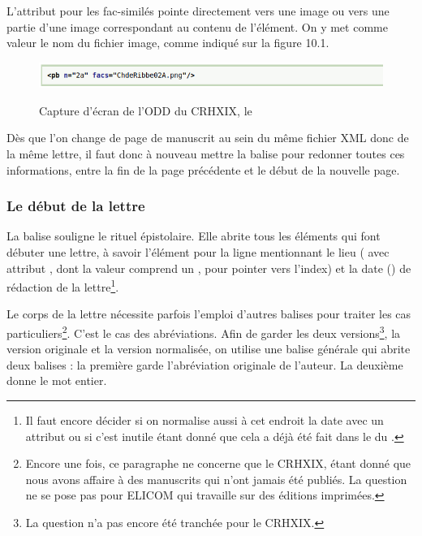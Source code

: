 L'attribut  pour les fac-similés pointe directement vers une image ou vers une partie d'une image correspondant au contenu de l'élément. On y met comme valeur le nom du fichier image, comme indiqué sur la figure 10.1.

\begin{figure}[ht]
    \centering
    \caption{Capture d'écran de l'ODD du CRHXIX, le }
    \includegraphics[width=16cm]{images/facs.png}
    \label{facs}
\end{figure}

Dès que l'on change de page de manuscrit au sein du même fichier XML donc de la même lettre, il faut donc à nouveau mettre la balise  pour redonner toutes ces informations, entre la fin de la page précédente et le début de la nouvelle page.

\subsubsection{Le début de la lettre}
La balise  souligne le rituel épistolaire. Elle abrite tous les éléments qui font débuter une lettre, à savoir l'élément  pour la ligne mentionnant le lieu ( avec attribut , dont la valeur comprend un \citecode{\#}, pour pointer vers l'index) et la date () de rédaction de la lettre\footnote{Il faut encore décider si on normalise aussi à cet endroit la date avec un attribut  ou si c'est inutile étant donné que cela a déjà été fait dans le  du .}.

Le corps de la lettre nécessite parfois l'emploi d'autres balises pour traiter les cas particuliers\footnote{Encore une fois, ce paragraphe ne concerne que le CRHXIX, étant donné que nous avons affaire à des manuscrits qui n'ont jamais été publiés. La question ne se pose pas pour ELICOM qui travaille sur des éditions imprimées.}. C'est le cas des abréviations. Afin de garder les deux versions\footnote{La question n'a pas encore été tranchée pour le CRHXIX.}, la version originale et la version normalisée, on utilise une balise générale  qui abrite deux balises : la première  garde l'abréviation originale de l'auteur. La deuxième  donne le mot entier.

